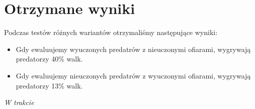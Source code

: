 \section{Otrzymane wyniki}
Podczas testów różnych wariantów otrzymaliśmy następujące wyniki:
\begin{itemize}
    \item Gdy ewaluujemy wyuczonych predatrów z nieuczonymi ofiarami, wygrywają predatorzy 40\% walk.
    \item Gdy ewaluujemy nieuczonych predatrów z wyuczonymi ofiarami, wygrywają predatorzy 13\% walk.
\end{itemize}

\textit{W trakcie}
